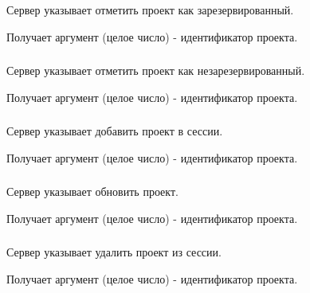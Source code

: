 Сервер указывает отметить проект как зарезервированный.

Получает аргумент  (целое число) - идентификатор проекта.

\subsubsection{}

Сервер указывает отметить проект как незарезервированный.

Получает аргумент  (целое число) - идентификатор проекта.

\subsubsection{}

Сервер указывает добавить проект в сессии.

Получает аргумент  (целое число) - идентификатор проекта.

\subsubsection{}

Сервер указывает обновить проект.

Получает аргумент  (целое число) - идентификатор проекта.

\subsubsection{}

Сервер указывает удалить проект из сессии.

Получает аргумент  (целое число) - идентификатор проекта.
